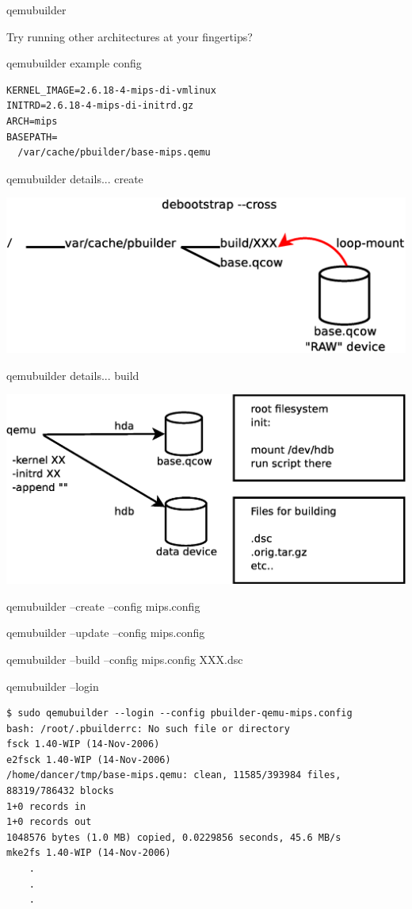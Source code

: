\documentclass[dvipdfm,17pt,times]{beamer}
\newcommand{\emtext}[1]{
\begin{frame}{}
 
{\Huge #1
}
\end{frame}
}
\begin{document}
\begin{frame}{qemubuilder}

 Try running other architectures at your fingertips?
\end{frame}

\begin{frame}[containsverbatim]{qemubuilder example config}

\begin{verbatim}
KERNEL_IMAGE=2.6.18-4-mips-di-vmlinux
INITRD=2.6.18-4-mips-di-initrd.gz
ARCH=mips
BASEPATH=
  /var/cache/pbuilder/base-mips.qemu
\end{verbatim}
\end{frame}

\begin{frame}{qemubuilder details... create}

\includegraphics[width=1\hsize]{qemubuilder-create.eps}
\end{frame}

\begin{frame}{qemubuilder details... build}

\includegraphics[width=1\hsize]{qemubuilder-build.eps}
\end{frame}

\emtext{qemubuilder --create --config mips.config}
\emtext{qemubuilder --update --config mips.config}
\emtext{qemubuilder --build --config mips.config XXX.dsc}
\begin{frame}[containsverbatim]{qemubuilder --login}
\begin{verbatim}
$ sudo qemubuilder --login --config pbuilder-qemu-mips.config
bash: /root/.pbuilderrc: No such file or directory
fsck 1.40-WIP (14-Nov-2006)
e2fsck 1.40-WIP (14-Nov-2006)
/home/dancer/tmp/base-mips.qemu: clean, 11585/393984 files, 88319/786432 blocks
1+0 records in
1+0 records out
1048576 bytes (1.0 MB) copied, 0.0229856 seconds, 45.6 MB/s
mke2fs 1.40-WIP (14-Nov-2006)
	.
	.
	.
\end{verbatim}\end{frame}
\end{document}
